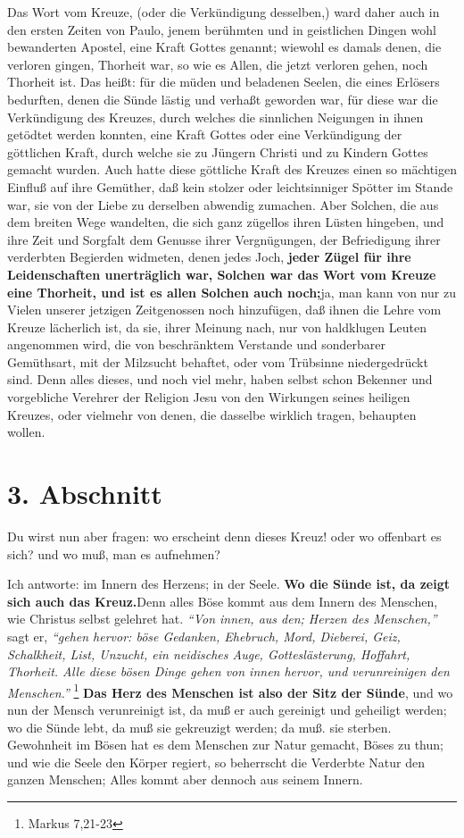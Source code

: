 Das Wort vom Kreuze, (oder die Verkündigung desselben,) ward daher auch in den
ersten Zeiten von Paulo, jenem berühmten und in geistlichen Dingen wohl
bewanderten Apostel, eine Kraft Gottes genannt; wiewohl es damals denen, die
verloren gingen, Thorheit war, so wie es Allen, die jetzt verloren gehen, noch
Thorheit ist. Das heißt: für die müden und beladenen Seelen, die eines Erlösers
bedurften, denen die Sünde lästig und verhaßt geworden war, für diese war die
Verkündigung des Kreuzes, durch welches die sinnlichen Neigungen in ihnen
getödtet werden konnten, eine Kraft Gottes oder eine Verkündigung der göttlichen
Kraft, durch welche sie zu Jüngern Christi und zu Kindern Gottes gemacht wurden.
Auch hatte diese göttliche Kraft des Kreuzes einen so mächtigen Einfluß auf ihre
Gemüther, daß kein stolzer oder leichtsinniger Spötter im Stande war, sie von
der Liebe zu derselben abwendig zumachen. Aber Solchen, die aus dem breiten Wege
wandelten, die sich ganz zügellos ihren Lüsten hingeben, und ihre Zeit und
Sorgfalt dem Genusse ihrer Vergnügungen, der Befriedigung ihrer verderbten
Begierden widmeten, denen jedes Joch, \textbf{jeder Zügel für ihre Leidenschaften
unerträglich war, Solchen war das Wort vom Kreuze eine Thorheit, und ist es
allen Solchen auch noch;}ja, man kann von nur zu Vielen unserer jetzigen
Zeitgenossen noch hinzufügen, daß ihnen die Lehre vom Kreuze lächerlich ist, da
sie, ihrer Meinung nach, nur von haldklugen Leuten angenommen wird, die von
beschränktem Verstande und sonderbarer Gemüthsart, mit der Milzsucht behaftet,
oder vom Trübsinne niedergedrückt sind. Denn alles dieses, und noch viel mehr,
haben selbst schon Bekenner und vorgebliche Verehrer der Religion Jesu von den
Wirkungen seines heiligen Kreuzes, oder vielmehr von denen, die dasselbe
wirklich tragen, behaupten wollen.

\section{3. Abschnitt} \label{kap3_ab3} 

Du wirst nun aber fragen: wo erscheint denn dieses Kreuz! oder wo offenbart es
sich? und wo muß, man es aufnehmen?

Ich antworte: im Innern des Herzens; in der Seele. \textbf{Wo die Sünde ist, da zeigt
sich auch das Kreuz.}Denn alles Böse kommt aus dem Innern des Menschen, wie
Christus selbst gelehret hat.
\textit{"`Von innen, aus den; Herzen des Menschen,"'} sagt er,
\textit{"`gehen hervor: böse Gedanken, Ehebruch, Mord, Dieberei, Geiz, Schalkheit,
List, Unzucht, ein neidisches Auge, Gotteslästerung, Hoffahrt, Thorheit. Alle
diese bösen Dinge gehen von innen hervor, und verunreinigen den
Menschen."'}
\footnote{Markus 7,21-23}
\textbf{Das Herz des Menschen ist also der Sitz der Sünde},
 und wo nun der Mensch
verunreinigt ist, da muß er auch gereinigt und
geheiligt werden; wo die Sünde lebt, da muß sie gekreuzigt werden; da muß. sie
sterben. Gewohnheit im Bösen hat es dem Menschen zur Natur gemacht, Böses zu
thun; und wie die Seele den Körper regiert, so beherrscht die Verderbte Natur
den ganzen Menschen; Alles kommt aber dennoch aus seinem Innern.

